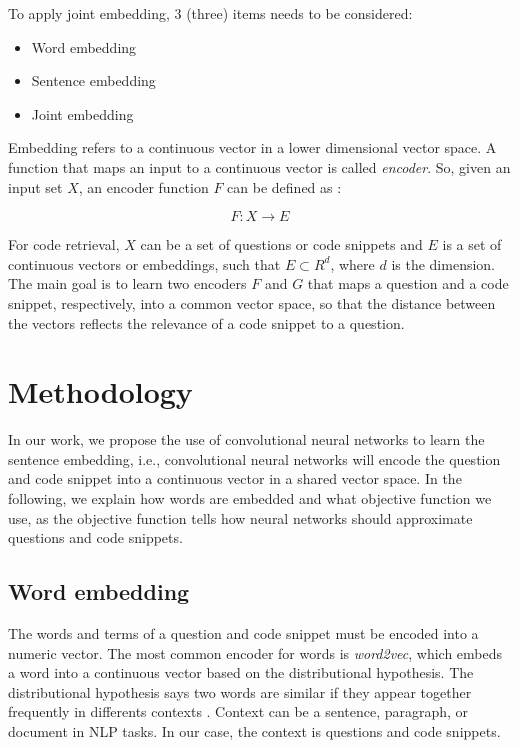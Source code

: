 \documentclass[sigconf]{acmart}
\begin{document}
To apply joint embedding, 3 (three) items needs to be considered:

\begin{itemize}
    \item Word embedding
    \item Sentence embedding
    \item Joint embedding
\end{itemize}

Embedding refers to a continuous vector in a lower dimensional vector space. A function that maps an input to a continuous vector is called \emph{encoder}. So, given an input set $X$, an encoder function $F$ can be defined as \cite{cambronero-deep-code-search-2019}:

\begin{equation}
    F: X \to E
\end{equation}

For code retrieval, $X$ can be a set of questions or code snippets and $E$ is a set of continuous vectors or embeddings, such that $E \subset R^{d}$, where $d$ is the dimension. The main goal is to learn two encoders $F$ and $G$ that maps a question and a code snippet, respectively, into a common vector space, so that the distance between the vectors reflects the relevance of a code snippet to a question.

\section{Methodology}
\label{sec:methodology}

 In our work, we propose the use of convolutional neural networks to learn the sentence embedding, i.e., convolutional neural networks will encode the question and code snippet into a continuous vector in a shared vector space. In the following, we explain how words are embedded and what objective function we use, as the objective function tells how neural networks should approximate questions and code snippets.

\subsection{Word embedding}
\label{sec:word-embedding}

The words and terms of a question and code snippet must be encoded into a numeric vector. The most common encoder for words is \emph{word2vec}, which embeds a word into a continuous vector based on the distributional hypothesis. The distributional hypothesis says two words are similar if they appear together frequently in differents contexts \citep{Goodfellow-et-al-2016}. Context can be a sentence, paragraph, or document in NLP tasks. In our case, the context is questions and code snippets.
\end{document}
